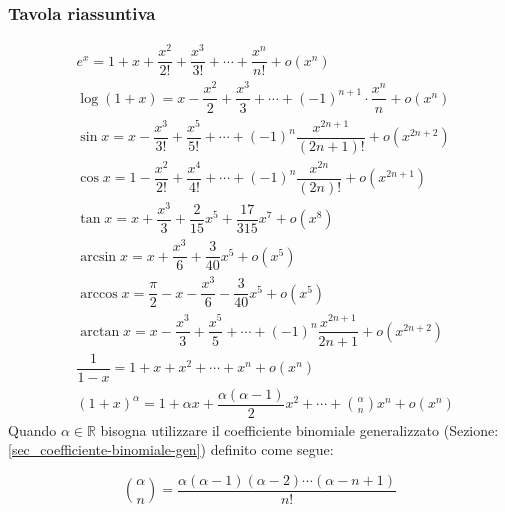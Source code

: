\clearpage %
\subsubsection{Tavola riassuntiva}
\begin{align*}
	&e^x = 1 + x + \dfrac{x^2}{2!} + \dfrac{x^3}{3!} + \cdots + \dfrac{x^n}{n!} 
    + o(x^n)\\[10pt]
	&\log(1 + x) = x - \dfrac{x^2}{2} + \dfrac{x^3}{3} + \cdots + (-1)^{n+1} 
    \cdot \dfrac{x^n}{n} + o(x^n)\\[10pt]
	&\sin{x} = x - \dfrac{x^3}{3!} + \dfrac{x^5}{5!} + \cdots + (-1)^n 
    \dfrac{x^{2n+1}}{(2n+1)!} + o(x^{2n+2})\\[10pt]
	&\cos{x} = 1 - \dfrac{x^2}{2!} + \dfrac{x^4}{4!} + \cdots + (-1)^n 
    \dfrac{x^{2n}}{(2n)!} + o(x^{2n+1})\\[10pt]
	&\tan{x} = x + \dfrac{x^3}{3} + \dfrac{2}{15}x^5 + \dfrac{17}{315}x^7 + 
    o(x^8)\\[10pt]
	&\arcsin{x} = x + \dfrac{x^3}{6} + \dfrac{3}{40}x^5 + o(x^5)\\[10pt]
	&\arccos{x} = \dfrac{\pi}{2} - x - \dfrac{x^3}{6} - \dfrac{3}{40} x^5 + 
    o(x^5)\\[10pt]
	&\arctan{x} = x - \dfrac{x^3}{3} + \dfrac{x^5}{5} + \cdots + (-1)^n 
    \dfrac{x^{2n+1}}{2n+1} + o(x^{2n+2})\\[10pt]
	&\dfrac{1}{1 - x} = 1 + x + x^2 + \cdots + x^n + o(x^n)\\[10pt]
	&(1 + x)^\alpha = 1 + \alpha x + \dfrac{\alpha(\alpha - 1)}{2} x^2 + 
    \cdots + \binom{\alpha}{n} x^n + o(x^n)
\end{align*}
Quando $\alpha \in \mathbb{R}$ bisogna utilizzare il coefficiente binomiale 
generalizzato (Sezione: \ref{sec_coefficiente-binomiale-gen}) definito come 
segue:

\begin{equation*}
	\binom{\alpha}{n} = \dfrac{\alpha (\alpha - 1) (\alpha -2) \cdots (\alpha 
    - n + 1)}{n!}
\end{equation*}
